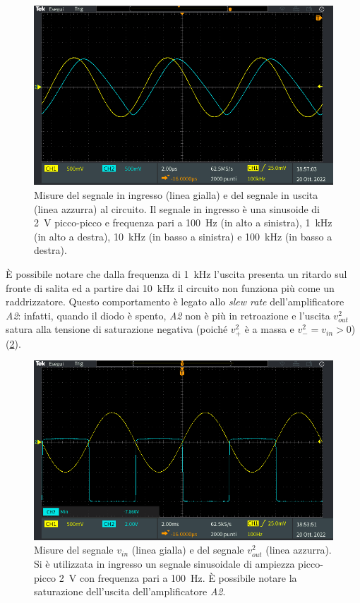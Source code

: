 \begin{figure}[h]
\begin{minipage}{.496\textwidth}
	\end{minipage}
	\begin{minipage}{.496\textwidth}
		\includegraphics[width=\linewidth]{./ImageFiles/Laboratorio 3/TEK00005.PNG}
	\end{minipage}
	\caption{Misure del segnale in ingresso (linea gialla) e del segnale in uscita (linea azzurra) al circuito. Il segnale in ingresso è una sinusoide di \SI{2}{\volt} picco-picco e frequenza pari a \SI{100}{\hertz} (in alto a sinistra), \SI{1}{\kilo\hertz} (in alto a destra), \SI{10}{\kilo\hertz} (in basso a sinistra) e \SI{100}{\kilo\hertz} (in basso a destra).}
	\label{fig:uscita_freq_circuito_1}
\end{figure}
\`E possibile notare che dalla frequenza di \SI{1}{\kilo\hertz} l'uscita presenta un ritardo sul fronte di salita ed a partire dai \SI{10}{\kilo\hertz} il circuito non funziona più come un raddrizzatore. Questo comportamento è legato allo \textit{slew rate} dell'amplificatore \textit{A2}: infatti, quando il diodo è spento, \textit{A2} non è più in retroazione e l'uscita $v_{out}^2$ satura alla tensione di saturazione negativa (poiché $v_+^2$ è a massa e $v_-^2=v_{in}>0$) (\Fig\ref{fig:uscita_sat_circuito_1}).
\begin{figure}[h]
	\centering
	\includegraphics[width=\linewidth]{./ImageFiles/Laboratorio 3/TEK00002.PNG}
	\caption{Misure del segnale $v_{in}$ (linea gialla) e del segnale $v_{out}^2$ (linea azzurra). Si è utilizzata in ingresso un segnale sinusoidale di ampiezza picco-picco \SI{2}{\volt} con frequenza pari a \SI{100}{\hertz}. \`E possibile notare la saturazione dell'uscita dell'amplificatore \textit{A2}.}
	\label{fig:uscita_sat_circuito_1}
\end{figure}
